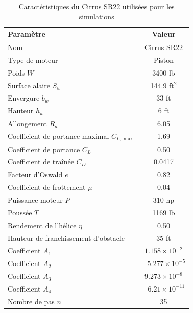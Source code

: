 	
				\begin{table}[H]
					\centering
					\caption{Caractéristiques du Cirrus SR22 utilisées pour les simulations}
					\begin{tabular}{|l|c|}
						\hline
						\textbf{Paramètre} & \textbf{Valeur} \\
						\hline
						Nom & Cirrus SR22 \\
						Type de moteur & Piston \\
						Poids $W$ & 3400 lb \\
						Surface alaire $S_w$ & 144.9 ft$^2$ \\
						Envergure $b_w$ & 33 ft \\
						Hauteur $h_w$ & 6 ft \\
						Allongement $R_a$ & 6.05 \\
						Coefficient de portance maximal $C_{L,\max}$ & 1.69 \\
						Coefficient de portance $C_L$ & 0.50 \\
						Coefficient de traînée $C_D$ & 0.0417 \\
						Facteur d'Oswald $e$ & 0.82 \\
						Coefficient de frottement $\mu$ & 0.04 \\
						Puissance moteur $P$ & 310 hp \\
						Poussée $T$ & 1169 lb \\
						Rendement de l'hélice $\eta$ & 0.50 \\
						Hauteur de franchissement d'obstacle & 35 ft \\
						Coefficient $A_1$ & $1.158\times10^{-2}$ \\
						Coefficient $A_2$ & $-5.277\times10^{-5}$ \\
						Coefficient $A_3$ & $9.273\times10^{-8}$ \\
						Coefficient $A_4$ & $-6.21\times10^{-11}$ \\
						Nombre de pas $n$ & 35 \\
						\hline
					\end{tabular}
					\label{tab:cirrus}
				\end{table}
				
		
			
